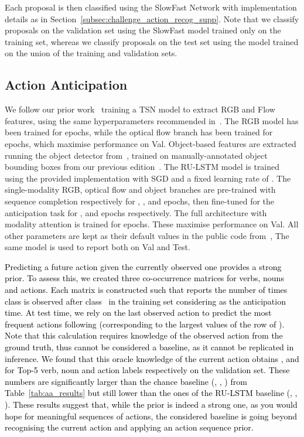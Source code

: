 \documentclass[twocolumn]{svjour3}          \smartqed
\newcommand{\chParagraph}[1]{\noindent {\textbf{#1.}} \hspace{6pt}}
\newcommand{\edits}[1]{\textcolor{black}{#1}}
\begin{document}
Each proposal is then classified using the SlowFast Network with implementation details as in Section~\ref{subsec:challenge_action_recog_supp}. Note that we classify proposals on the validation set using the SlowFast model trained only on the training set, whereas we classify proposals on the test set using the model trained on the union of the training and validation sets.


\subsection{Action Anticipation}


\chParagraph{Implementation and Training Details}
We follow our prior work~\cite{furnari2019would} training a TSN model to extract RGB and Flow features, using the same hyperparameters recommended in~\cite{furnari2019would}.
The RGB model has been trained for  epochs, while the optical flow branch has been trained for  epochs, which maximise performance on Val.
Object-based features are extracted running the object detector from~\cite{furnari2019would}, trained on manually-annotated object bounding boxes from our previous edition~\cite{Damen2018EPICKITCHENS}. 
The RU-LSTM model is trained using the provided implementation with SGD and a fixed learning rate of . The single-modality RGB, optical flow and object branches are pre-trained with sequence completion respectively for , , and  epochs, then fine-tuned for the anticipation task for ,  and  epochs respectively. The full architecture with modality attention is trained for  epochs. These maximise performance on Val. All other parameters are kept as their default values in the public code from~\cite{furnari2019would}, The same model is used to report both on Val and Test. 

\chParagraph{\edits{Impact of current action on anticipation}}
\edits{Predicting a future action given the currently observed one provides a strong prior. To assess this, we created three co-occurrence matrices for verbs, nouns and actions. Each matrix  is constructed such that  reports the number of times class  is observed after class~ in the training set considering  as the anticipation time. At test time, we rely on the last observed action  to predict the most frequent  actions following  (corresponding to the  largest values of the  row of ). 
Note that this calculation requires knowledge of the observed action from the ground truth, thus cannot be considered a baseline, as it cannot be replicated in inference.
We found that this oracle knowledge of the current action
obtains ,  and  for Top-5 verb, noun and action labels respectively on the validation set. These numbers are significantly larger than the chance baseline (, , ) from Table~\ref{tab:aa_results} but still lower than the ones of the RU-LSTM baseline (, , ). These results suggest that, while the prior is indeed a strong one, as you would hope for meaningful sequences of actions, the considered baseline is going beyond recognising the current action and applying an action sequence prior.}
\end{document}
